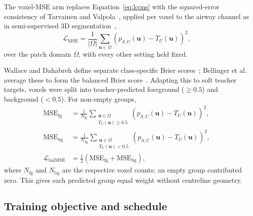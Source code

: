 The voxel-MSE arm replaces Equation~\eqref{eq:lcons} with the squared-error consistency of
Tarvainen and Valpola~\cite{tarvainen2017mean}, applied per voxel to the airway channel as in
semi-supervised 3D segmentation~\cite{yu2019uamt},
\begin{equation}
  \mathcal{L}_{\mathrm{MSE}}
  =\frac{1}{|\Omega|}\sum_{\mathbf{u}\in\Omega}
   \left(p_{S,U}(\mathbf{u})-T_U(\mathbf{u})\right)^{2},
  \label{eq:lmse}
\end{equation}
over the patch domain $\Omega$, with every other setting held fixed.

Wallace and Dahabreh define separate class-specific Brier scores~\cite{wallace2014imbalanced};
Bellinger et al. average these to form the balanced Brier score~\cite{bellinger2020remix}.
Adapting this to soft teacher targets, voxels were split into teacher-predicted foreground
($\geq0.5$) and background ($<0.5$). For non-empty groups,
\begin{equation}
  \begin{aligned}
    \mathrm{MSE}_{\mathrm{fg}}
    &=\frac{1}{N_{\mathrm{fg}}}
      \sum_{\substack{\mathbf{u}\in\Omega\\T_U(\mathbf{u})\geq0.5}}
      \left(p_{S,U}(\mathbf{u})-T_U(\mathbf{u})\right)^2,\\
    \mathrm{MSE}_{\mathrm{bg}}
    &=\frac{1}{N_{\mathrm{bg}}}
      \sum_{\substack{\mathbf{u}\in\Omega\\T_U(\mathbf{u})<0.5}}
      \left(p_{S,U}(\mathbf{u})-T_U(\mathbf{u})\right)^2,\\
    \mathcal{L}_{\mathrm{balMSE}}
    &=\frac{1}{2}\left(\mathrm{MSE}_{\mathrm{fg}}+\mathrm{MSE}_{\mathrm{bg}}\right),
  \end{aligned}
  \label{eq:lbalancedmse}
\end{equation}
where $N_{\mathrm{fg}}$ and $N_{\mathrm{bg}}$ are the respective voxel counts; an empty
group contributed zero. This gives each predicted group equal weight without centreline geometry.

\subsection{Training objective and schedule}

